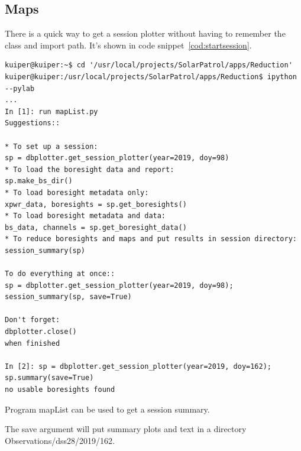 \documentclass[letterpaper,11pt]{report}
\begin{document}
\subsection{Maps}

There is a quick way to get a session plotter without having to remember the
class and import path.  It's shown in code snippet~\ref{cod:startsession}.
\begin{code}[h!tb]
    \begin{center}
        {\scriptsize \begin{verbatim}
kuiper@kuiper:~$ cd '/usr/local/projects/SolarPatrol/apps/Reduction'
kuiper@kuiper:/usr/local/projects/SolarPatrol/apps/Reduction$ ipython --pylab
...
In [1]: run mapList.py
Suggestions::

* To set up a session:
sp = dbplotter.get_session_plotter(year=2019, doy=98)
* To load the boresight data and report:
sp.make_bs_dir()
* To load boresight metadata only:
xpwr_data, boresights = sp.get_boresights()
* To load boresight metadata and data:
bs_data, channels = sp.get_boresight_data() 
* To reduce boresights and maps and put results in session directory:
session_summary(sp)

To do everything at once::
sp = dbplotter.get_session_plotter(year=2019, doy=98); session_summary(sp, save=True)

Don't forget:
dbplotter.close()
when finished

In [2]: sp = dbplotter.get_session_plotter(year=2019, doy=162); sp.summary(save=True)
no usable boresights found
            \end{verbatim}
        }\caption{\label{cod:startsession}Program {\ttfamily mapList} can be used
        to get a session summary.}
    \end{center}
\end{code}
\noindent The {\ttfamily save} argument will put summary plots and text
in a directory {\small \ttfamily Observations/dss28/2019/162}.
\end{document}
